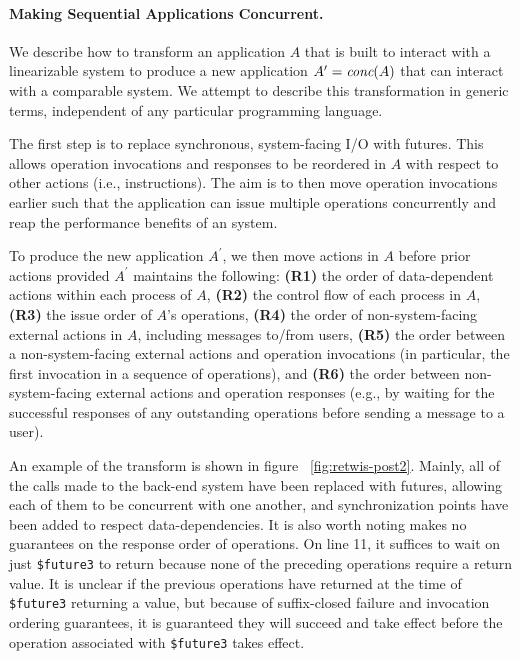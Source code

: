\paragraph{Making Sequential Applications Concurrent.}
\label{sec:mdl:transform}

We describe how to transform an application $A$ that is built to
interact with a linearizable system to produce a new application
$A^\prime = \operatorname*{\textit{conc}}(A)$ that can interact with a comparable \MDL{} system.
We attempt to describe this transformation in generic terms, independent of any particular programming language.

The first step is to replace synchronous, system-facing I/O with
futures. This allows operation invocations and responses
to be reordered in $A$ with respect to other actions (i.e., instructions).
The aim is to then move operation invocations earlier such that the application
can issue multiple operations concurrently and reap the performance benefits 
of an \MDL{} system.

To produce the new application $A^\prime$, we then move actions in $A$ before prior 
actions provided $A^\prime$ maintains the following:
\textbf{(R1)} the order of data-dependent actions within
each process of $A$,
\textbf{(R2)} the control flow of each process in $A$,
\textbf{(R3)} the issue order of $A$'s operations,
\textbf{(R4)} the order of non-system-facing external
actions in $A$, including messages to/from users,
\textbf{(R5)} the order between a non-system-facing external 
actions and operation invocations (in particular, the first invocation in a
sequence of operations), and
\textbf{(R6)} the order between non-system-facing external actions and operation responses (e.g., by waiting for the successful responses of any outstanding operations before sending a message to a user).

An example of the transform is shown in figure ~\ref{fig:retwis-post2}. Mainly, all of the calls made to the back-end system have been replaced with futures, allowing each of them to be concurrent with one another, and synchronization points have been added to respect data-dependencies. It is also worth noting \mdl{} makes no guarantees on the response order of operations. On line 11, it suffices to wait on just \texttt{\$future3} to return because none of the preceding operations require a return value. It is unclear if the previous operations have returned at the time of \texttt{\$future3} returning a value, but because of suffix-closed failure and invocation ordering guarantees, it is guaranteed they will succeed and take effect before the operation associated with \texttt{\$future3} takes effect.

